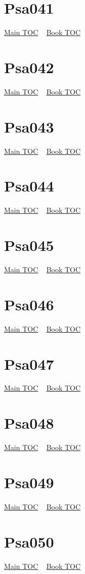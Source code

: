 \documentclass{book}
\begin{document}
  \section{Psa041}\hyperlink{toc}{Main TOC} ~ \hyperref[subsec:Psa]{Book TOC} 
  \section{Psa042}\hyperlink{toc}{Main TOC} ~ \hyperref[subsec:Psa]{Book TOC} 
  \section{Psa043}\hyperlink{toc}{Main TOC} ~ \hyperref[subsec:Psa]{Book TOC} 
  \section{Psa044}\hyperlink{toc}{Main TOC} ~ \hyperref[subsec:Psa]{Book TOC} 
  \section{Psa045}\hyperlink{toc}{Main TOC} ~ \hyperref[subsec:Psa]{Book TOC} 
  \section{Psa046}\hyperlink{toc}{Main TOC} ~ \hyperref[subsec:Psa]{Book TOC} 
  \section{Psa047}\hyperlink{toc}{Main TOC} ~ \hyperref[subsec:Psa]{Book TOC} 
  \section{Psa048}\hyperlink{toc}{Main TOC} ~ \hyperref[subsec:Psa]{Book TOC} 
  \section{Psa049}\hyperlink{toc}{Main TOC} ~ \hyperref[subsec:Psa]{Book TOC} 
  \section{Psa050}\hyperlink{toc}{Main TOC} ~ \hyperref[subsec:Psa]{Book TOC} 
\end{document}

